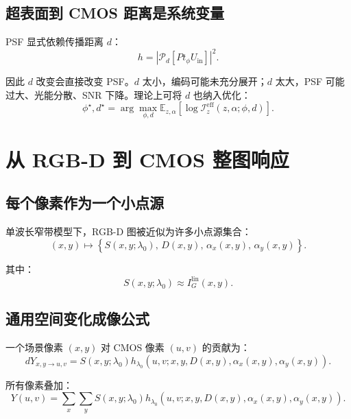 \documentclass[11pt,a4paper,fontset=none]{ctexart}
\begin{document}
\subsection{超表面到 CMOS 距离是系统变量}

PSF 显式依赖传播距离 $d$：
\begin{equation}
  h=
  \left|
  \mathcal P_d
  \left[
  P t_\phi U_{\mathrm{in}}
  \right]
  \right|^2.
\end{equation}

因此 $d$ 改变会直接改变 PSF。$d$ 太小，编码可能未充分展开；$d$ 太大，PSF 可能过大、光能分散、SNR 下降。理论上可将 $d$ 也纳入优化：
\begin{equation}
  \phi^\star,d^\star
  =
  \arg\max_{\phi,d}
  \mathbb E_{z,\alpha}
  \left[
  \log \mathcal I_z^{\mathrm{eff}}(z,\alpha;\phi,d)
  \right].
\end{equation}

\section{从 RGB-D 到 CMOS 整图响应}

\subsection{每个像素作为一个小点源}

单波长窄带模型下，RGB-D 图被近似为许多小点源集合：
\begin{equation}
  (x,y)
  \mapsto
  \left\{
  S(x,y;\lambda_0),\,
  D(x,y),\,
  \alpha_x(x,y),\,
  \alpha_y(x,y)
  \right\}.
\end{equation}

其中：
\begin{equation}
  S(x,y;\lambda_0)\approx I_G^{\mathrm{lin}}(x,y).
\end{equation}

\subsection{通用空间变化成像公式}

一个场景像素 $(x,y)$ 对 CMOS 像素 $(u,v)$ 的贡献为：
\begin{equation}
  dY_{x,y\rightarrow u,v}
  =
  S(x,y;\lambda_0)
  h_{\lambda_0}
  \left(
  u,v;
  x,y,
  D(x,y),
  \alpha_x(x,y),
  \alpha_y(x,y)
  \right).
\end{equation}

所有像素叠加：
\begin{equation}
\boxed{
  Y(u,v)
  =
  \sum_x\sum_y
  S(x,y;\lambda_0)
  h_{\lambda_0}
  \left(
  u,v;
  x,y,
  D(x,y),
  \alpha_x(x,y),
  \alpha_y(x,y)
  \right).
}
\end{equation}
\end{document}
